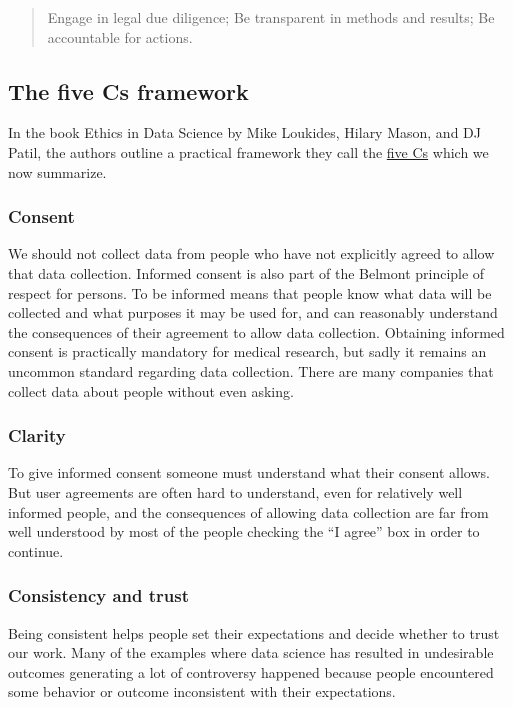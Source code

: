\documentclass[]{book}
\theoremstyle{definition}
\theoremstyle{definition}
\theoremstyle{definition}
\theoremstyle{remark}
\begin{document}
\begin{quote}
Engage in legal due diligence; Be transparent in methods and results; Be
accountable for actions.
\end{quote}

\subsection{The five Cs framework}\label{the-five-cs-framework}

In the book Ethics in Data Science by Mike Loukides, Hilary Mason, and
DJ Patil, the authors outline a practical framework they call the
\href{https://resources.oreilly.com/examples/0636920203964/blob/master/the_five_cs.md}{five
Cs} which we now summarize.

\subsubsection{Consent}\label{consent}

We should not collect data from people who have not explicitly agreed to
allow that data collection. Informed consent is also part of the Belmont
principle of respect for persons. To be informed means that people know
what data will be collected and what purposes it may be used for, and
can reasonably understand the consequences of their agreement to allow
data collection. Obtaining informed consent is practically mandatory for
medical research, but sadly it remains an uncommon standard regarding
data collection. There are many companies that collect data about people
without even asking.

\subsubsection{Clarity}\label{clarity}

To give informed consent someone must understand what their consent
allows. But user agreements are often hard to understand, even for
relatively well informed people, and the consequences of allowing data
collection are far from well understood by most of the people checking
the ``I agree'' box in order to continue.

\subsubsection{Consistency and trust}\label{consistency-and-trust}

Being consistent helps people set their expectations and decide whether
to trust our work. Many of the examples where data science has resulted
in undesirable outcomes generating a lot of controversy happened because
people encountered some behavior or outcome inconsistent with their
expectations.
\end{document}
